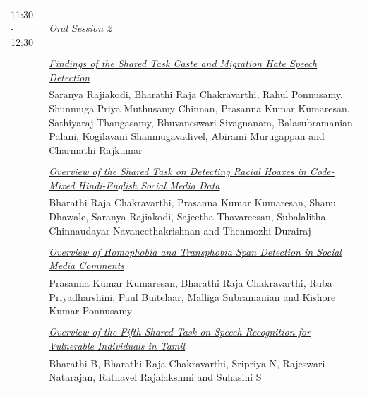\documentclass[11pt,oneside]{book}
\begin{document}
\begin{tabular}{p{24mm}p{124mm}}
                        11:30 - 12:30 & \emph{Oral Session 2}\\\\
      
                
                      & \hyperlink{page.214}{\emph{Findings of the Shared Task Caste and Migration Hate Speech Detection}}\\
        & Saranya Rajiakodi\index{Rajiakodi}, Bharathi Raja Chakravarthi\index{Chakravarthi}, Rahul Ponnusamy\index{Ponnusamy}, Shunmuga Priya Muthusamy Chinnan\index{Chinnan}, Prasanna Kumar Kumaresan\index{Kumaresan}, Sathiyaraj Thangasamy\index{Thangasamy}, Bhuvaneswari Sivagnanam\index{Sivagnanam}, Balasubramanian Palani\index{Palani}, Kogilavani Shanmugavadivel\index{Shanmugavadivel}, Abirami Murugappan\index{Murugappan} and Charmathi Rajkumar\index{Rajkumar}\\\\
                
                      & \hyperlink{page.221}{\emph{Overview of the Shared Task on Detecting Racial Hoaxes in Code-Mixed Hindi-English Social Media Data}}\\
        & Bharathi Raja Chakravarthi\index{Chakravarthi}, Prasanna Kumar Kumaresan\index{Kumaresan}, Shanu Dhawale\index{Dhawale}, Saranya Rajiakodi\index{Rajiakodi}, Sajeetha Thavareesan\index{Thavareesan}, Subalalitha Chinnaudayar Navaneethakrishnan\index{Navaneethakrishnan} and Thenmozhi Durairaj\index{Durairaj}\\\\
                
                      & \hyperlink{page.228}{\emph{Overview of Homophobia and Transphobia Span Detection in Social Media Comments}}\\
        & Prasanna Kumar Kumaresan\index{Kumaresan}, Bharathi Raja Chakravarthi\index{Chakravarthi}, Ruba Priyadharshini\index{Priyadharshini}, Paul Buitelaar\index{Buitelaar}, Malliga Subramanian\index{Subramanian} and Kishore Kumar Ponnusamy\index{Ponnusamy}\\\\
                
                      & \hyperlink{page.234}{\emph{Overview of the Fifth Shared Task on Speech Recognition for Vulnerable Individuals in Tamil}}\\
        & Bharathi B\index{B}, Bharathi Raja Chakravarthi\index{Chakravarthi}, Sripriya N\index{N}, Rajeswari Natarajan\index{Natarajan}, Ratnavel Rajalakshmi\index{Rajalakshmi} and Suhasini S\index{S}\\\\
              \end{tabular}
\end{document}
